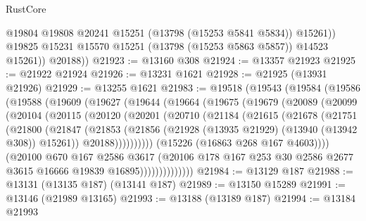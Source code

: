 \begin{lexlean}{RustCore}
\begin{coremodule}
                @19804
                @19808
                @20241
                @15251
                (@13798 (@15253 @5841 @5834))
                @15261))
            @19825
            @15231
            @15570
            @15251
            (@13798 (@15253 @5863 @5857))
            @14523
            @15261))
        @20188))
@21923 := @13160 @308
@21924 := @13357 @21923
@21925 := @21922 @21924
@21926 := @13231 @1621
@21928 := @21925 (@13931 @21926)
@21929 := @13255 @1621
@21983 := @19518
    (@19543
      (@19584
        (@19586
          (@19588
            (@19609
              (@19627
                (@19644
                  (@19664
                    (@19675
                      (@19679
                        (@20089
                          (@20099
                            (@20104
                              (@20115
                                (@20120
                                  (@20201
                                    (@20710
                                      (@21184
                                        (@21615
                                          (@21678
                                            (@21751
                                              (@21800
                                                (@21847
                                                  (@21853
                                                    (@21856
                                                      (@21928
                                                        (@13935 @21929)
                                                        (@13940 (@13942 @308))
                                                        @15261))
                                                    @20188))))))))))
                                (@15226 (@16863 @268 @167 @4603))))
                            (@20100
                              @670
                              @167
                              @2586
                              @3617
                              (@20106
                                @178
                                @167
                                @253
                                @30
                                @2586
                                @2677
                                @3615
                                @16666
                                @19839
                                @16895))))))))))))))
@21984 := @13129 @187
@21988 := @13131 (@13135 @187) (@13141 @187)
@21989 := @13150 @15289
@21991 := @13146 (@21989 @13165)
@21993 := @13188 (@13189 @187)
@21994 := @13184 @21993

\end{coremodule}
\end{lexlean}
